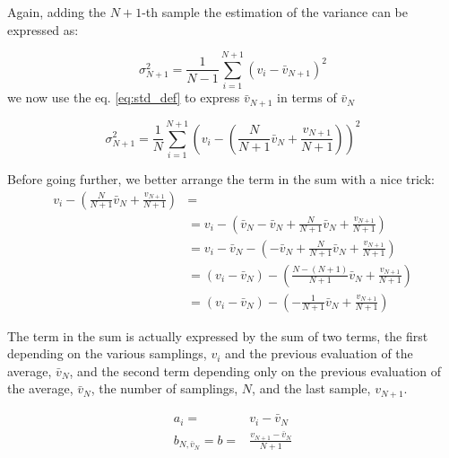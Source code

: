 \documentclass[a4paper]{article}
\newcommand{\avg}{\bar{v}}
\begin{document}
Again, adding the $N+1$-th sample the estimation of the variance can be
expressed as:

\begin{equation}
\sigma_{N+1}^2   =  \frac{1}{N-1} \sum_{i=1}^{N+1} \left(v_i -
\avg_{N+1}\right)^2
\end{equation}
we now use the eq. \ref{eq:std_def} to express $\avg_{N+1}$ in terms of
$\avg_N$

\begin{equation}
\sigma_{N+1}^2  = \frac{1}{N} \sum_{i=1}^{N+1} \left(v_i -
\left( \frac{N}{N+1} \avg_{N} + \frac{v_{N+1}}{N+1} \right)
 \right)^2 
 \label{eq:var-n+1}
\end{equation}

Before going further, we better arrange the term in the sum with a nice trick:
\begin{align}
v_i - \left(\frac{N}{N+1} \avg_{N} + \frac{v_{N+1}}{N+1}\right)& =  \nonumber \\
& = v_i - \left( \avg_N - \avg_N + \frac{N}{N+1} \avg_{N}+
\frac{v_{N+1}}{N+1}\right) \nonumber \\
& = v_i - \avg_N - \left( - \avg_N + \frac{N}{N+1} \avg_{N}+
\frac{v_{N+1}}{N+1}\right) \nonumber \\
& = \left(v_i - \avg_N\right) - \left( \frac{N-(N+1)}{N+1} \avg_{N}+
\frac{v_{N+1}}{N+1}\right) \nonumber \\
& = \left(v_i - \avg_N\right) - \left(-\frac{1}{N+1} \avg_{N}+
\frac{v_{N+1}}{N+1}\right) 
\label{eq:trick}
\end{align}

The term in the sum is actually expressed by the sum of two terms, the first
depending on the various samplings, $v_i$ and the previous evaluation of the
average, $\avg_N$,
and the second term depending only on the previous evaluation of the average,
$\avg_N$, the number of samplings, $N$, and the last sample, $v_{N+1}$.

\begin{align}
a_i = & v_i - \avg_N \label{eq:a_i} \\
b_{N,\avg_N} = b = & \frac{v_{N+1}-\avg_{N}}{N+1} \label{eq:b}
\end{align}
\end{document}
